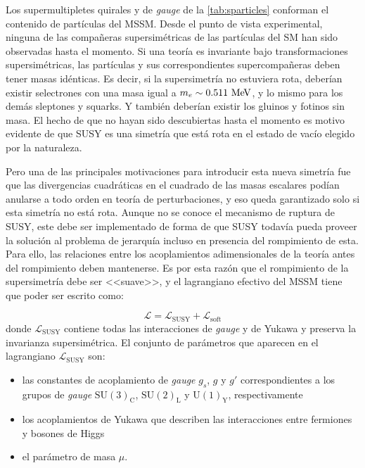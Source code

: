 Los supermultipletes quirales y de \emph{gauge} de la \cref{tab:sparticles} conforman
el contenido de partículas del MSSM. Desde el punto de vista experimental,
ninguna de las compa\~neras supersimétricas de las partículas del SM han sido
observadas hasta el momento.
Si una teoría es invariante bajo transformaciones supersimétricas, las
partículas y sus correspondientes supercompa\~neras deben tener masas idénticas.
Es decir, si la supersimetría no estuviera rota, deberían
existir selectrones con una masa igual a $m_e \sim 0.511 \mev$, y lo mismo para
los demás sleptones y squarks. Y también deberían existir los gluinos y fotinos
sin masa. El hecho de que no hayan sido descubiertas hasta el momento es motivo
evidente de que SUSY es una simetría que está rota en el estado de vacío elegido
por la naturaleza.

Pero una de las principales motivaciones para introducir esta nueva simetría fue
que las divergencias cuadráticas en el cuadrado de las masas escalares podían
anularse a todo orden en teoría de perturbaciones, y eso queda garantizado solo
si esta simetría no está rota. Aunque no se conoce el mecanismo de ruptura de
SUSY, este debe ser implementado de forma de que SUSY todavía pueda proveer la
solución al problema de jerarquía incluso en presencia del rompimiento de esta.
Para ello, las relaciones entre los acoplamientos adimensionales de la
teoría antes del rompimiento deben mantenerse. Es por esta razón que el
rompimiento de la supersimetría debe ser <<suave>>, y
el lagrangiano efectivo del MSSM tiene que poder ser escrito como:

\begin{equation}
  \mathcal{L} = \mathcal{L}_\text{SUSY} + \mathcal{L}_\text{soft}
\end{equation}
%
donde $\mathcal{L}_\text{SUSY}$ contiene todas las interacciones de \emph{gauge} y de
Yukawa y preserva la invarianza supersimétrica.
El conjunto de parámetros que aparecen en el lagrangiano $\mathcal{L}_\text{SUSY}$ son:

\begin{itemize}\itemsep0.2cm\parskip0.2cm
\item las constantes de acoplamiento de \emph{gauge} $g_s$, $g$ y $g'$ correspondientes a
  los grupos de \emph{gauge} $\mathrm{SU}(3)_\mathrm{C}$, $\mathrm{SU}(2)_\mathrm{L}$ y $\mathrm{U}(1)_\mathrm{Y}$, respectivamente
\item los acoplamientos de Yukawa que describen las interacciones entre fermiones y bosones de Higgs
\item el parámetro de masa $\mu$.
\end{itemize}


